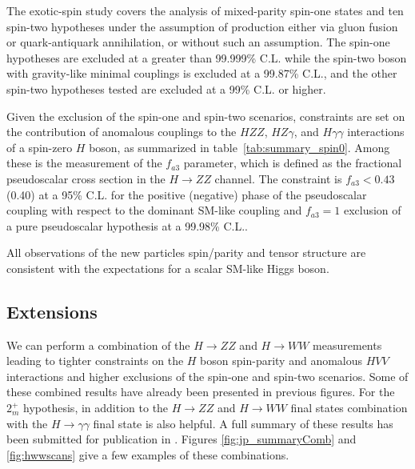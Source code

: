 The exotic-spin study covers the analysis of mixed-parity spin-one states and ten spin-two hypotheses
under the assumption of production either via gluon fusion or quark-antiquark annihilation, or without
such an assumption. The spin-one hypotheses are excluded at a greater than 99.999\% C.L. while the spin-two boson with gravity-like minimal couplings is excluded at a 99.87\% C.L., and the other
spin-two hypotheses tested are excluded at a 99\% C.L. or higher.

Given the exclusion of the spin-one and spin-two scenarios,
constraints are set on the contribution of anomalous couplings to the
$HZZ$, $HZ\gamma$, and $H\gamma\gamma$ interactions
of a spin-zero $H$ boson, as summarized in table~\ref{tab:summary_spin0}.
Among these is the measurement of the $f_{a3}$ parameter,
which is defined as the fractional pseudoscalar cross section in the $H\to ZZ$ channel.
The constraint is $f_{a3}<0.43$ (0.40) at a 95\% C.L. for the positive (negative)
phase of the pseudoscalar coupling with respect to the dominant SM-like coupling
and $f_{a3}=1$ exclusion of a pure pseudoscalar hypothesis at a 99.98\% C.L..

All observations of the new particles spin/parity and tensor structure are consistent with the expectations for a scalar SM-like Higgs boson.

\subsection{Extensions}

We can perform a combination of the $H\to ZZ$ and $H \to WW$ measurements leading to tighter constraints on the $H$ boson spin-parity and anomalous $HVV$ interactions and higher exclusions of the spin-one and spin-two scenarios. Some of these combined results have already been presented in previous figures. For the $2_{m}^{+}$ hypothesis, in addition to the $H \to ZZ$ and $H \to WW$ final states combination with the $H \to \gamma\gamma$ final state is also helpful. A full summary of these results has been submitted for publication in \cite{Khachatryan:2014kca}. Figures \ref{fig:jp_summaryComb} and \ref{fig:hwwscans} give a few examples of these combinations.

